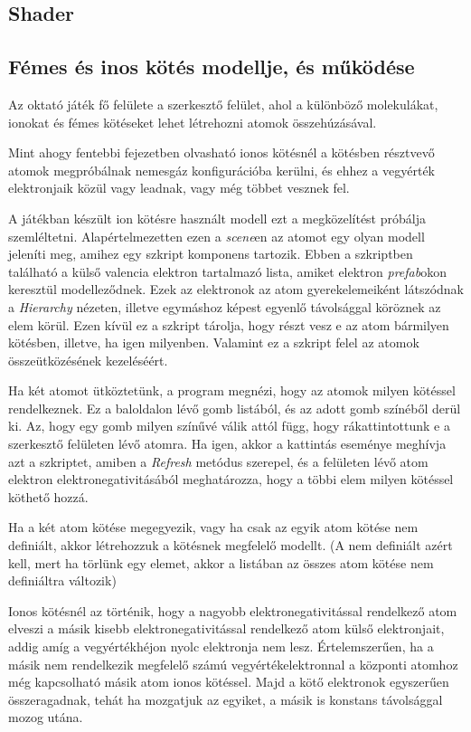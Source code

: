 \documentclass[colorlinks]{thesis-ekf}
\theoremstyle{definition}
\theoremstyle{remark}
\begin{document}
\subsection{Shader}

\subsection{Fémes és inos kötés modellje, és működése}
Az oktató játék fő felülete a szerkesztő felület, ahol a különböző molekulákat, ionokat és fémes kötéseket lehet létrehozni atomok összehúzásával.

Mint ahogy fentebbi fejezetben olvasható ionos kötésnél a kötésben résztvevő atomok megpróbálnak nemesgáz konfigurációba kerülni, és ehhez a vegyérték elektronjaik közül vagy leadnak, vagy még többet vesznek fel.

A játékban készült ion kötésre használt modell ezt a megközelítést próbálja szemléltetni. Alapértelmezetten ezen a \textit{scene}en az atomot egy olyan modell jeleníti meg, amihez egy szkript komponens tartozik. Ebben a szkriptben található a külső valencia elektron tartalmazó lista, amiket elektron\textit{ prefab}okon keresztül modelleződnek. Ezek az elektronok az atom gyerekelemeiként látszódnak a \textit{Hierarchy} nézeten, illetve egymáshoz képest egyenlő távolsággal köröznek az elem körül. Ezen kívül ez a szkript tárolja, hogy részt vesz e az atom bármilyen kötésben, illetve, ha igen milyenben. Valamint ez a szkript felel az atomok összeütközésének kezeléséért.

Ha két atomot ütköztetünk, a program megnézi, hogy az atomok milyen kötéssel rendelkeznek. Ez a baloldalon lévő gomb listából, és az adott gomb színéből derül ki. Az, hogy egy gomb milyen színűvé válik attól függ, hogy rákattintottunk e a szerkesztő felületen lévő atomra. Ha igen, akkor a kattintás eseménye meghívja azt a szkriptet, amiben a \textit{Refresh} metódus szerepel, és a felületen lévő atom elektron elektronegativitásából meghatározza, hogy a többi elem milyen kötéssel köthető hozzá.

Ha a két atom kötése megegyezik, vagy ha csak az egyik atom kötése nem definiált, akkor létrehozzuk a kötésnek megfelelő modellt. (A nem definiált azért kell, mert ha törlünk egy elemet, akkor a listában az összes atom kötése nem definiáltra változik)

Ionos kötésnél az történik, hogy a nagyobb elektronegativitással rendelkező atom elveszi a másik kisebb elektronegativitással rendelkező atom külső elektronjait, addig amíg a vegyértékhéjon nyolc elektronja nem lesz. Értelemszerűen, ha a másik nem rendelkezik megfelelő számú vegyértékelektronnal a központi atomhoz még kapcsolható másik atom ionos kötéssel. Majd a kötő elektronok egyszerűen összeragadnak, tehát ha mozgatjuk az egyiket, a másik is konstans távolsággal mozog utána.
\end{document}
